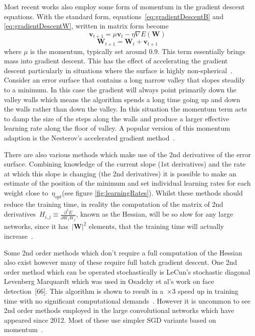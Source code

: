\documentclass[11pt]{article} %
\begin{document}
Most recent works \cite{Zeiler2014,Pfister,Simonyan2015,Sermanet2013b} also employ some form of momentum in the gradient descent equations. With the standard form, equations~\ref{eq:gradientDescentB} and \ref{eq:gradientDescentW}, written in matrix form become
\begin{equation}
\boldsymbol v_{t+1}=\mu \boldsymbol v_{t} -\eta \nabla E(\boldsymbol W)
\label{eq:gradientDescentMomentum}
\end{equation}
\begin{equation}
\boldsymbol W_{t+1}=\boldsymbol W_{t}+\boldsymbol v_{t+1}
\label{eq:gradientDescentMomentum2}
\end{equation}
where $\mu$ is the momentum, typically set around 0.9. This term essentially brings mass into gradient descent. This has the effect of accelerating the gradient descent particularly in situations where the surface is highly non-spherical~\cite{Polyak1964,Sutskever2013a}. Consider an error surface that contains a long narrow valley that slopes steadily to a minimum. In this case the gradient will always point primarily down the valley walls which means the algorithm spends a long time going up and down the walls rather than down the valley. In this situation the momentum term acts to damp the size of the steps along the walls and produce a larger effective learning rate along the floor of valley. A popular version of this momentum adaption is the Nesterov’s accelerated gradient method~\cite{Nesterov1983,Sutskever2013a,Bengio2013}. 

There are also various methods which make use of the 2nd derivatives of the error surface. Combining knowledge of the current slope (1st derivatives) and the rate at which this slope is changing (the 2nd derivatives) it is possible to make an estimate of the position of the minimum and set individual learning rates for each weight close to~$\eta_{opt}$(see figure \ref{fig:learningRates}). Whilst these methods should reduce the training time, in reality the computation of the matrix of 2nd derivatives~$H_{i,j}\equiv\frac{\partial^2E}{\partial W_iW_j}$, known as the Hessian, will be so slow for any large networks, since it has~$|\boldsymbol W|^2$ elements, that the training time will actually increase~\cite{LeCun1998a}.

Some 2nd order methods which don't require a full computation of the Hessian also exist however many of these require full batch gradient descent. One 2nd order method which can be operated stochastically is LeCun's stochastic diagonal Levenberg Marquardt which was used in Osadchy et al's work on face detection~[66]. This algorithm is shown to result in a~$\times 3$ speed up in training time with no significant computational demands~\cite{LeCun1998a}. However it is uncommon to see 2nd order methods employed in the large convolutional networks which have appeared since 2012. Most of these use simpler SGD variants based on momentum~\cite{KarLects}.
\end{document}
